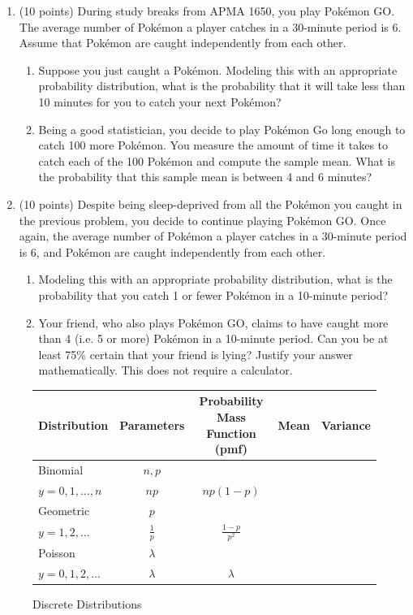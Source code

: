 \documentclass[12pt]{article}
\begin{document}
\begin{enumerate}
\pagebreak 

\item (10 points) During study breaks from APMA 1650, you play Pok\'emon GO. The average number of Pok\'emon a player catches in a 30-minute period is 6. Assume that Pok\'emon are caught independently from each other.
\begin{enumerate}
\item Suppose you just caught a Pok\'emon. Modeling this with an appropriate probability distribution, what is the probability that it will take less than 10 minutes for you to catch your next Pok\'emon? 
\item Being a good statistician, you decide to play Pok\'emon Go long enough to catch 100 more Pok\'emon. You measure the amount of time it takes to catch each of the 100 Pok\'emon and compute the sample mean. What is the probability that this sample mean is between 4 and 6 minutes?
\end{enumerate}
\pagebreak

\item (10 points) Despite being sleep-deprived from all the Pok\'emon you caught in the previous problem, you decide to continue playing Pok\'emon GO. Once again, the average number of Pok\'emon a player catches in a 30-minute period is 6, and Pok\'emon are caught independently from each other.
\begin{enumerate}
\item Modeling this with an appropriate probability distribution, what is the probability that you catch 1 or fewer Pok\'emon in a 10-minute period?
\item Your friend, who also plays Pok\'emon GO, claims to have caught more than 4 (i.e. 5 or more) Pok\'emon in a 10-minute period. Can you be at least 75\% certain that your friend is lying? Justify your answer mathematically. This does not require a calculator.
\end{enumerate}

\end{enumerate}

\pagebreak 


\begin{figure}[H]
\caption{Discrete Distributions}
\begin{tabular}{l c c c c}
\hline
Distribution & Parameters & Probability Mass Function (pmf) & Mean & Variance \\
\hline
Binomial & $n, p$ & \makecell{ $\displaystyle p(y) = \binom{n}{y}p^y(1-p)^{n-y}$\\$ \displaystyle y = 0, 1, \dots, n$} & $np$ & $np(1-p)$ \\
Geometric & $p$ & \makecell{ $\displaystyle p(y) = (1-p)^{y-1}p$ \\ $y = 1, 2, \dots$} & $ \displaystyle \frac{1}{p}$ & $\displaystyle \frac{1 - p}{p^2}$ \\
Poisson & $\lambda$ & \makecell{ $\displaystyle p(y) = \frac{e^{-\lambda} \lambda^y }{y!}$ \\ $y = 0, 1, 2, \dots$ } & $\lambda$ & $\lambda$ \\
\end{tabular}
\end{figure}
\end{document}
